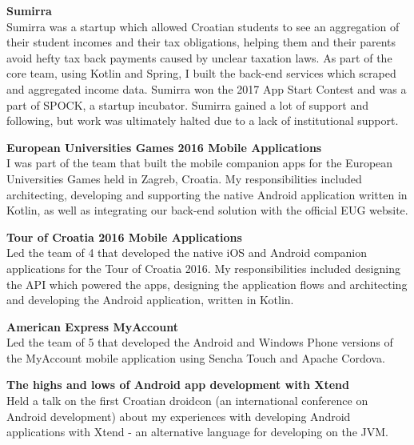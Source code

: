 \documentclass[10pt, a4paper, final, onecolumn, oneside, notitlepage]{article}
\newcommand{\halfsectionspacing}[0]{ \vspace{4pt} }
\begin{document}
\begin{center}
\begin{flushleft}
\halfsectionspacing

\textbf{Sumirra} \\
Sumirra was a startup which allowed Croatian students to see an aggregation of their student incomes and their tax obligations, helping them and their parents avoid hefty tax back payments caused by unclear taxation laws. As part of the core team, using Kotlin and Spring, I built the back-end services which scraped and aggregated income data. Sumirra won the 2017 App Start Contest and was a part of SPOCK, a startup incubator. Sumirra gained a lot of support and following, but work was ultimately halted due to a lack of institutional support.

\halfsectionspacing

\textbf{European Universities Games 2016 Mobile Applications} \\
I was part of the team that built the mobile companion apps for the European Universities Games held in Zagreb, Croatia. My responsibilities included architecting, developing and supporting the native Android application written in Kotlin, as well as integrating our back-end solution with the official EUG website.

\halfsectionspacing

\textbf{Tour of Croatia 2016 Mobile Applications} \\
Led the team of 4 that developed the native iOS and Android companion applications for the Tour of Croatia 2016. My responsibilities included designing the API which powered the apps, designing the application flows and architecting and developing the Android application, written in Kotlin.

\halfsectionspacing

\textbf{American Express MyAccount} \\
Led the team of 5 that developed the Android and Windows Phone versions of the MyAccount mobile application using Sencha Touch and Apache Cordova.

\halfsectionspacing

\textbf{The highs and lows of Android app development with Xtend} \\
Held a talk on the first Croatian droidcon (an international conference on Android development) about my experiences with developing Android applications with Xtend - an alternative language for developing on the JVM.

\end{flushleft}



\end{center}
\end{document}
